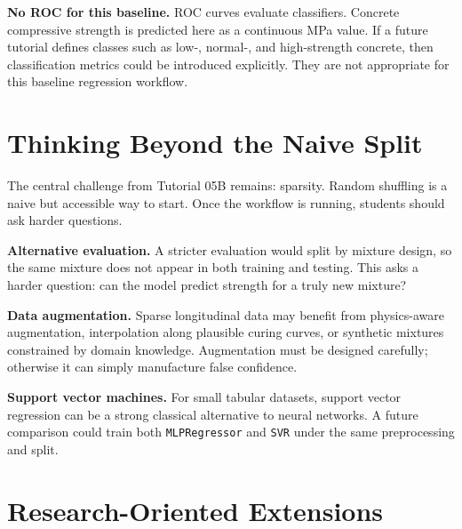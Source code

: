 \documentclass[11pt]{article}
\begin{document}
\begin{alert-box}
\textbf{No ROC for this baseline.}  ROC curves evaluate classifiers.  Concrete compressive strength is predicted here as a continuous MPa value.  If a future tutorial defines classes such as low-, normal-, and high-strength concrete, then classification metrics could be introduced explicitly.  They are not appropriate for this baseline regression workflow.
\end{alert-box}

\section{Thinking Beyond the Naive Split}
\label{sec:beyond-naive}

The central challenge from Tutorial 05B remains: sparsity.  Random shuffling is a naive but accessible way to start.  Once the workflow is running, students should ask harder questions.

\begin{def-box}
\textbf{Alternative evaluation.}  A stricter evaluation would split by mixture design, so the same mixture does not appear in both training and testing.  This asks a harder question: can the model predict strength for a truly new mixture?
\end{def-box}

\begin{def-box}
\textbf{Data augmentation.}  Sparse longitudinal data may benefit from physics-aware augmentation, interpolation along plausible curing curves, or synthetic mixtures constrained by domain knowledge.  Augmentation must be designed carefully; otherwise it can simply manufacture false confidence.
\end{def-box}

\begin{def-box}
\textbf{Support vector machines.}  For small tabular datasets, support vector regression can be a strong classical alternative to neural networks.  A future comparison could train both \texttt{MLPRegressor} and \texttt{SVR} under the same preprocessing and split.
\end{def-box}

\section{Research-Oriented Extensions}
\label{sec:research-extensions}
\end{document}
